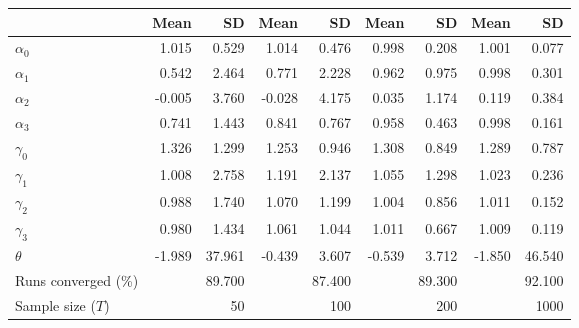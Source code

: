 
\begin{tabular}[t]{lrrrrrrrr}
\toprule
  & Mean & SD & Mean  & SD  & Mean   & SD   & Mean    & SD   \\
\midrule
$\alpha_{0}$ & 1.015 & 0.529 & 1.014 & 0.476 & 0.998 & 0.208 & 1.001 & 0.077\\
$\alpha_{1}$ & 0.542 & 2.464 & 0.771 & 2.228 & 0.962 & 0.975 & 0.998 & 0.301\\
$\alpha_{2}$ & -0.005 & 3.760 & -0.028 & 4.175 & 0.035 & 1.174 & 0.119 & 0.384\\
$\alpha_{3}$ & 0.741 & 1.443 & 0.841 & 0.767 & 0.958 & 0.463 & 0.998 & 0.161\\
$\gamma_{0}$ & 1.326 & 1.299 & 1.253 & 0.946 & 1.308 & 0.849 & 1.289 & 0.787\\
$\gamma_{1}$ & 1.008 & 2.758 & 1.191 & 2.137 & 1.055 & 1.298 & 1.023 & 0.236\\
$\gamma_{2}$ & 0.988 & 1.740 & 1.070 & 1.199 & 1.004 & 0.856 & 1.011 & 0.152\\
$\gamma_{3}$ & 0.980 & 1.434 & 1.061 & 1.044 & 1.011 & 0.667 & 1.009 & 0.119\\
$\theta$ & -1.989 & 37.961 & -0.439 & 3.607 & -0.539 & 3.712 & -1.850 & 46.540\\
Runs converged (\%) &  & 89.700 &  & 87.400 &  & 89.300 &  & 92.100\\
Sample size ($T$) &  & 50 &  & 100 &  & 200 &  & 1000\\
\bottomrule
\end{tabular}

